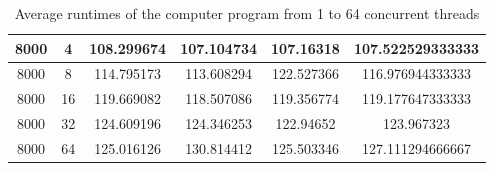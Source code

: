\documentclass{article}
\begin{document}
\begin{table}[H]
{\begin{tabular}{|c|c|ccc|c|}
    8000                                                                                   & 4                                                                                                    & \multicolumn{1}{c|}{108.299674}       & \multicolumn{1}{c|}{107.104734}      & 107.16318       & 107.522529333333                                                                           \\ \hline
    8000                                                                                   & 8                                                                                                    & \multicolumn{1}{c|}{114.795173}       & \multicolumn{1}{c|}{113.608294}      & 122.527366      & 116.976944333333                                                                           \\ \hline
    8000                                                                                   & 16                                                                                                   & \multicolumn{1}{c|}{119.669082}       & \multicolumn{1}{c|}{118.507086}      & 119.356774      & 119.177647333333                                                                           \\ \hline
    8000                                                                                   & 32                                                                                                   & \multicolumn{1}{c|}{124.609196}       & \multicolumn{1}{c|}{124.346253}      & 122.94652       & 123.967323                                                                                 \\ \hline
    8000                                                                                   & 64                                                                                                   & \multicolumn{1}{c|}{125.016126}       & \multicolumn{1}{c|}{130.814412}      & 125.503346      & 127.111294666667                                                                           \\ \hline
    \end{tabular}}
    \caption{\label{table}Average runtimes of the computer program from 1 to 64 concurrent threads}
    \end{table}
\end{document}

